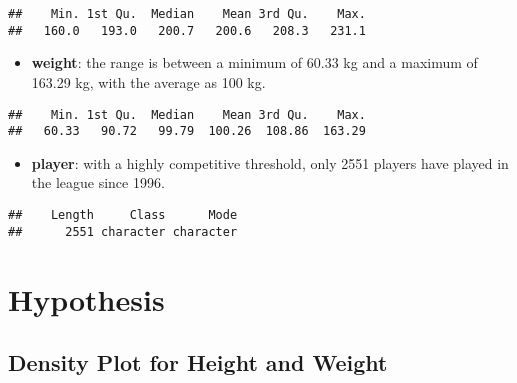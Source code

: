 \documentclass[
]{book}
\newenvironment{Shaded}{\begin{snugshade}}{\end{snugshade}}
\newcommand{\FunctionTok}[1]{\textcolor[rgb]{0.13,0.29,0.53}{\textbf{#1}}}
\newcommand{\NormalTok}[1]{#1}
\newcommand{\SpecialCharTok}[1]{\textcolor[rgb]{0.81,0.36,0.00}{\textbf{#1}}}
\providecommand{\tightlist}{%
  \setlength{\itemsep}{0pt}\setlength{\parskip}{0pt}}
\theoremstyle{definition}
\theoremstyle{definition}
\theoremstyle{definition}
\theoremstyle{definition}
\theoremstyle{remark}
\begin{document}
\begin{verbatim}
##    Min. 1st Qu.  Median    Mean 3rd Qu.    Max. 
##   160.0   193.0   200.7   200.6   208.3   231.1
\end{verbatim}

\begin{itemize}
\tightlist
\item
  \textbf{weight}: the range is between a minimum of 60.33 kg and a maximum of 163.29 kg, with the average as 100 kg.
\end{itemize}

\begin{Shaded}
\end{Shaded}

\begin{verbatim}
##    Min. 1st Qu.  Median    Mean 3rd Qu.    Max. 
##   60.33   90.72   99.79  100.26  108.86  163.29
\end{verbatim}

\begin{itemize}
\tightlist
\item
  \textbf{player}: with a highly competitive threshold, only 2551 players have played in the league since 1996.
\end{itemize}

\begin{Shaded}
\end{Shaded}

\begin{verbatim}
##    Length     Class      Mode 
##      2551 character character
\end{verbatim}

\hypertarget{hypothesis}{%
\chapter{Hypothesis}\label{hypothesis}}

\hypertarget{density-plot-for-height-and-weight}{%
\section{Density Plot for Height and Weight}\label{density-plot-for-height-and-weight}}
\end{document}
